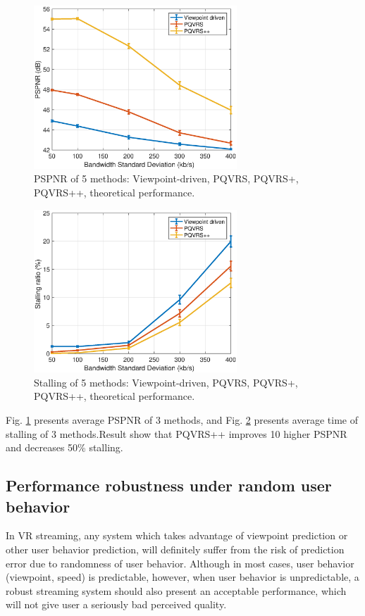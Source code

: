   \begin{figure}
  \centering
  \includegraphics[width=3in]{images/throughput-PSPNR.eps}
  \caption{PSPNR of 5 methods: Viewpoint-driven, PQVRS, PQVRS+, PQVRS++, theoretical performance.}
  \label{practical_PSPNR}
  \end{figure}
  
    \begin{figure}
  \centering
  \includegraphics[width=3in]{images/throughput-stalltime.eps}
  \caption{Stalling of 5 methods: Viewpoint-driven, PQVRS, PQVRS+, PQVRS++, theoretical performance.}
  \label{practical_stall}
  \end{figure}

Fig. \ref{practical_PSPNR} presents average PSPNR of 3 methods, and Fig. \ref{practical_stall} presents average time of stalling of 3 methods.Result show that PQVRS++ improves 10 higher PSPNR and decreases 50\% stalling.

\subsection{Performance robustness under random user behavior}

In VR streaming, any system which takes advantage of viewpoint prediction or other user behavior prediction, will definitely suffer from the risk of prediction error due to randomness of user behavior. Although in most cases, user behavior (viewpoint, speed) is predictable, however, when user behavior is unpredictable, a robust streaming system should also present an acceptable performance, which will not give user a seriously bad perceived quality.

